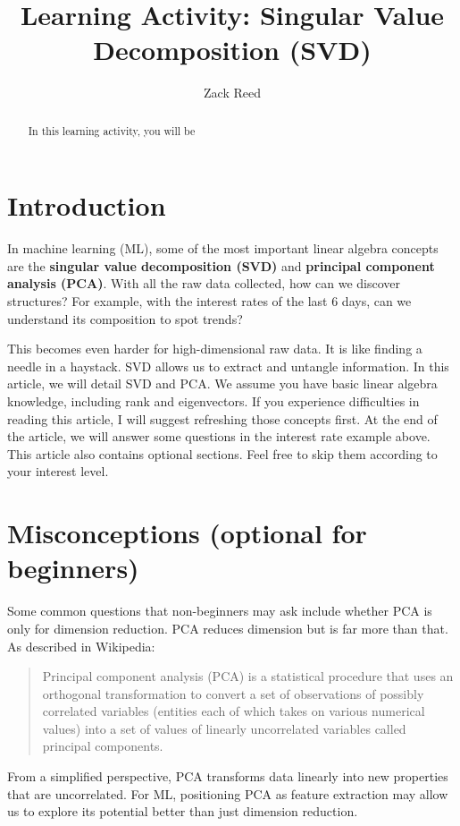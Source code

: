 \documentclass{ximera}
\author{Zack Reed}
\title{Learning Activity: Singular Value Decomposition (SVD)}
\begin{document}
\begin{abstract}

    In this learning activity, you will be 
\end{abstract}
\maketitle

\section*{Introduction}
In machine learning (ML), some of the most important linear algebra concepts are the \textbf{singular value decomposition (SVD)} and \textbf{principal component analysis (PCA)}. With all the raw data collected, how can we discover structures? For example, with the interest rates of the last 6 days, can we understand its composition to spot trends?

This becomes even harder for high-dimensional raw data. It is like finding a needle in a haystack. SVD allows us to extract and untangle information. In this article, we will detail SVD and PCA. We assume you have basic linear algebra knowledge, including rank and eigenvectors. If you experience difficulties in reading this article, I will suggest refreshing those concepts first. At the end of the article, we will answer some questions in the interest rate example above. This article also contains optional sections. Feel free to skip them according to your interest level.

\section*{Misconceptions (optional for beginners)}
Some common questions that non-beginners may ask include whether PCA is only for dimension reduction. PCA reduces dimension but is far more than that. As described in Wikipedia:

\begin{quote}
Principal component analysis (PCA) is a statistical procedure that uses an orthogonal transformation to convert a set of observations of possibly correlated variables (entities each of which takes on various numerical values) into a set of values of linearly uncorrelated variables called principal components.
\end{quote}

From a simplified perspective, PCA transforms data linearly into new properties that are uncorrelated. For ML, positioning PCA as feature extraction may allow us to explore its potential better than just dimension reduction.
\end{document}
